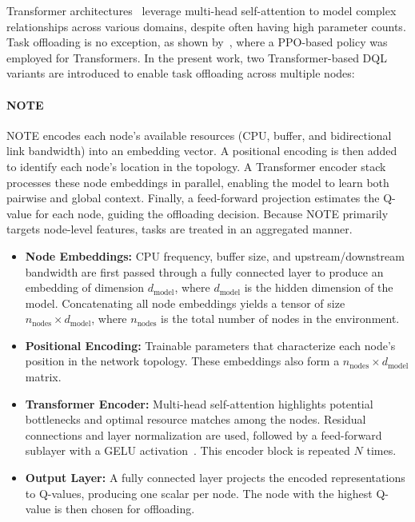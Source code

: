 \documentclass[preprint,3p,authoryear]{elsarticle}
\begin{document}
Transformer architectures~\citep{vaswani2023attentionneed} leverage multi-head self-attention to model complex relationships across various domains, despite often having high parameter counts. Task offloading is no exception, as shown by~\citet{gholipour_tpto_2023}, where a PPO-based policy was employed for Transformers. In the present work, two Transformer-based DQL variants are introduced to enable task offloading across multiple nodes:

\paragraph{NOTE}\label{par:note}

NOTE encodes each node’s available resources (CPU, buffer, and bidirectional link bandwidth) into an embedding vector. A positional encoding is then added to identify each node’s location in the topology. A Transformer encoder stack processes these node embeddings in parallel, enabling the model to learn both pairwise and global context. Finally, a feed-forward projection estimates the Q-value for each node, guiding the offloading decision. Because NOTE primarily targets node-level features, tasks are treated in an aggregated manner.

\begin{itemize}
    \item \textbf{Node Embeddings:} CPU frequency, buffer size, and upstream/downstream bandwidth are first passed through a fully connected layer to produce an embedding of dimension \(\displaystyle d_{\text{model}}\), where \(d_{\text{model}}\) is the hidden dimension of the model. Concatenating all node embeddings yields a tensor of size \(\displaystyle n_{\text{nodes}} \times d_{\text{model}}\), where \(n_{\text{nodes}}\) is the total number of nodes in the environment.
    \item \textbf{Positional Encoding:} Trainable parameters that characterize each node’s position in the network topology. These embeddings also form a \(\displaystyle n_{\text{nodes}} \times d_{\text{model}}\) matrix.
    \item \textbf{Transformer Encoder:} Multi-head self-attention highlights potential bottlenecks and optimal resource matches among the nodes. Residual connections and layer normalization are used, followed by a feed-forward sublayer with a GELU activation~\citep{hendrycks2023gaussianerrorlinearunits}. This encoder block is repeated \(N\) times.
    \item \textbf{Output Layer:} A fully connected layer projects the encoded representations to Q-values, producing one scalar per node. The node with the highest Q-value is then chosen for offloading.
\end{itemize}
\end{document}
